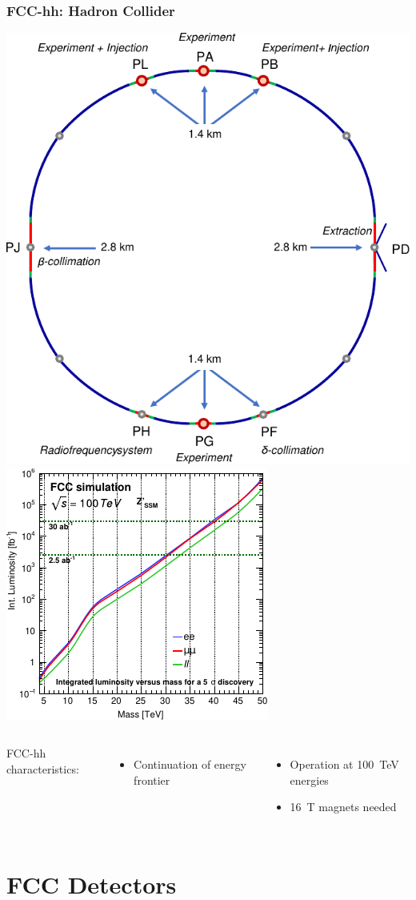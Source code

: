 \documentclass[aspectratio=169]{beamer}
\newcommand{\bluetext}[1]{%
  \textcolor{myBlue}{#1}
}
\begin{document}
\begin{frame}
  \frametitle{FCC-hh: Hadron Collider}

  \includegraphics[width=.49\linewidth]{figures/FCC_hh_ring.pdf}
  \includegraphics[width=.49\linewidth]{figures/FCC_hh_Zprime_ll.pdf}

  \begin{columns}[c]
    \bluetext{FCC-hh characteristics:}
    \begin{itemize}
      \item Continuation of energy frontier
    \end{itemize}

    \begin{itemize}
      \item Operation at 100~TeV energies
      \item 16~T magnets needed
    \end{itemize}
  \end{columns}
\end{frame}

%
%
\section{FCC Detectors}
\end{document}
